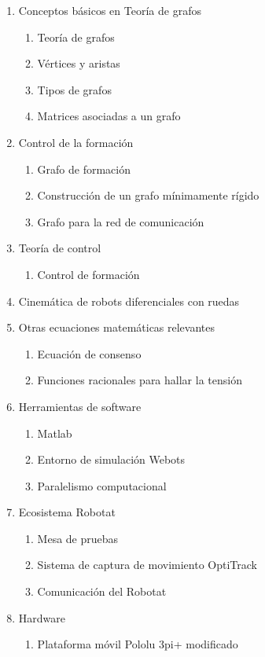 \begin{enumerate}
\begin{enumerate}
		\item Conceptos básicos en Teoría de grafos
		\begin{enumerate}
			\item Teoría de grafos
			\item Vértices y aristas
			\item Tipos de grafos
			\item Matrices asociadas a un grafo
		\end{enumerate}
		\item Control de la formación
		\begin{enumerate}
			\item Grafo de formación
			\item Construcción de un grafo mínimamente rígido
			\item Grafo para la red de comunicación
		\end{enumerate}
		\item Teoría de control
		\begin{enumerate}
			\item Control de formación
		\end{enumerate}
		\item Cinemática de robots diferenciales con ruedas
		\item Otras ecuaciones matemáticas relevantes
		\begin{enumerate}
			\item Ecuación de consenso
			\item Funciones racionales para hallar la tensión
		\end{enumerate}
		\item Herramientas de software
		\begin{enumerate}
			\item Matlab
			\item Entorno de simulación Webots
			\item Paralelismo computacional
		\end{enumerate}
		\item Ecosistema Robotat
		\begin{enumerate}
			\item Mesa de pruebas
			\item Sistema de captura de movimiento OptiTrack
			\item Comunicación del Robotat
		\end{enumerate}
		\item Hardware
		\begin{enumerate}
			\item Plataforma móvil Pololu 3pi+ modificado

\end{enumerate}
\end{enumerate}
\end{enumerate}

